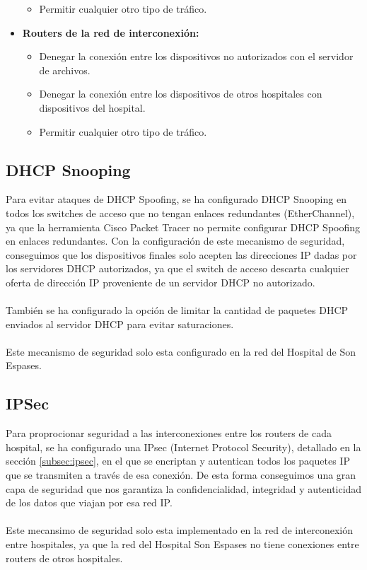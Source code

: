 \begin{itemize}
\begin{itemize}
        \item Permitir cualquier otro tipo de tráfico.
    \end{itemize}
    \item \textbf{Routers de la red de interconexión:}
    \begin{itemize}
        \item Denegar la conexión entre los dispositivos no autorizados con el servidor de archivos.
        \item Denegar la conexión entre los dispositivos de otros hospitales con dispositivos del hospital.
        \item Permitir cualquier otro tipo de tráfico.
    \end{itemize}
\end{itemize}

\subsection{DHCP Snooping}
Para evitar ataques de DHCP Spoofing, se ha configurado DHCP Snooping en todos los switches de acceso que no tengan enlaces redundantes (EtherChannel), ya que la herramienta Cisco Packet Tracer no permite 
configurar DHCP Spoofing en enlaces redundantes. Con la configuración de este mecanismo de seguridad, conseguimos que los dispositivos finales solo acepten las direcciones IP dadas por los servidores DHCP autorizados, 
ya que el switch de acceso descarta cualquier oferta de dirección IP proveniente de un servidor DHCP no autorizado.
\\ \\
También se ha configurado la opción de limitar la cantidad de paquetes DHCP enviados al servidor DHCP para evitar saturaciones.
\\ \\
Este mecanismo de seguridad solo esta configurado en la red del Hospital de Son Espases.

\subsection{IPSec}
Para proprocionar seguridad a las interconexiones entre los routers de cada hospital, se ha configurado una IPsec (Internet Protocol Security), detallado en la sección \ref{subsec:ipsec}, en el que se encriptan y autentican todos los paquetes IP que se transmiten a través de esa conexión.
De esta forma conseguimos una gran capa de seguridad que nos garantiza la confidencialidad, integridad y autenticidad de los datos que viajan por esa red IP.
\\ \\
Este mecansimo de seguridad solo esta implementado en la red de interconexión entre hospitales, ya que la red del Hospital Son Espases no tiene conexiones entre routers de otros hospitales.

